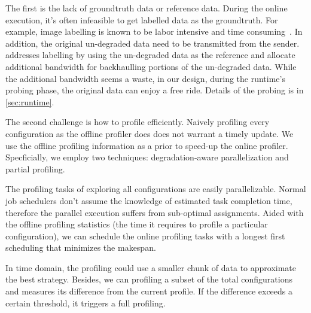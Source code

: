 The first is the lack of groundtruth data or reference data. During the online
execution, it's often infeasible to get labelled data as the groundtruth. For
example, image labelling is known to be labor intensive and time
consuming~\cite{russell2008labelme}. In addition, the original un-degraded data
need to be transmitted from the sender.  \sysname{} addresses labelling by using
the un-degraded data as the reference and allocate additional bandwidth for
backhaulling portions of the un-degraded data. While the additional bandwidth
seems a waste, in our design, during the runtime's probing phase, the original
data can enjoy a free ride. Details of the probing is in \autoref{sec:runtime}.

The second challenge is how to profile efficiently. Naively profiling every
configuration as the offline profiler does does not warrant a timely update. We
use the offline profiling information as a prior to speed-up the online
profiler. Specficially, we employ two techniques: degradation-aware
parallelization and partial profiling.

 The profiling tasks of exploring all
configurations are easily parallelizable. Normal job schedulers don't assume the
knowledge of estimated task completion time, therefore the parallel execution
suffers from sub-optimal assignments. Aided with the offline profiling
statistics (the time it requires to profile a particular configuration), we can
schedule the online profiling tasks with a longest first scheduling that
minimizes the makespan.

 In time domain, the profiling could use a smaller
chunk of data to approximate the best strategy. Besides, we can profiling a
subset of the total configurations and measures its difference from the current
profile. If the difference exceeds a certain threshold, it triggers a full
profiling.

